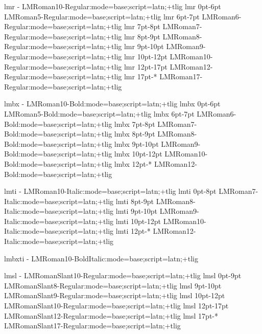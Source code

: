 


\nofontmessages


\def\LMfeat#1{:mode=base;script=latn;+tlig}



\registertfm lmr        -      LMRoman10-Regular\LMfeat{}
\registertfm lmr     0pt-6pt   LMRoman5-Regular\LMfeat{}
\registertfm lmr     6pt-7pt   LMRoman6-Regular\LMfeat{}
\registertfm lmr     7pt-8pt   LMRoman7-Regular\LMfeat{}
\registertfm lmr     8pt-9pt   LMRoman8-Regular\LMfeat{}
\registertfm lmr     9pt-10pt  LMRoman9-Regular\LMfeat{}
\registertfm lmr    10pt-12pt  LMRoman10-Regular\LMfeat{}
\registertfm lmr    12pt-17pt  LMRoman12-Regular\LMfeat{}
\registertfm lmr    17pt-*     LMRoman17-Regular\LMfeat{}

\registertfm lmbx       -      LMRoman10-Bold\LMfeat{}
\registertfm lmbx    0pt-6pt   LMRoman5-Bold\LMfeat{}
\registertfm lmbx    6pt-7pt   LMRoman6-Bold\LMfeat{}
\registertfm lmbx    7pt-8pt   LMRoman7-Bold\LMfeat{}
\registertfm lmbx    8pt-9pt   LMRoman8-Bold\LMfeat{}
\registertfm lmbx    9pt-10pt  LMRoman9-Bold\LMfeat{}
\registertfm lmbx   10pt-12pt  LMRoman10-Bold\LMfeat{}
\registertfm lmbx   12pt-*     LMRoman12-Bold\LMfeat{}

\registertfm lmti       -      LMRoman10-Italic\LMfeat{}
\registertfm lmti    0pt-8pt   LMRoman7-Italic\LMfeat{}
\registertfm lmti    8pt-9pt   LMRoman8-Italic\LMfeat{}
\registertfm lmti    9pt-10pt  LMRoman9-Italic\LMfeat{}
\registertfm lmti   10pt-12pt  LMRoman10-Italic\LMfeat{}
\registertfm lmti   12pt-*     LMRoman12-Italic\LMfeat{}

\registertfm lmbxti     -      LMRoman10-BoldItalic\LMfeat{}

\registertfm lmsl       -      LMRomanSlant10-Regular\LMfeat{}
\registertfm lmsl    0pt-9pt   LMRomanSlant8-Regular\LMfeat{}
\registertfm lmsl    9pt-10pt  LMRomanSlant9-Regular\LMfeat{}
\registertfm lmsl   10pt-12pt  LMRomanSlant10-Regular\LMfeat{}
\registertfm lmsl   12pt-17pt  LMRomanSlant12-Regular\LMfeat{}
\registertfm lmsl   17pt-*     LMRomanSlant17-Regular\LMfeat{}

